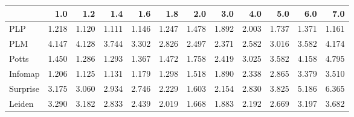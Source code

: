 \begin{tabular}{lrrrrrrrrrrr}
\toprule
{} &   1.0 &   1.2 &   1.4 &   1.6 &   1.8 &   2.0 &   3.0 &   4.0 &   5.0 &   6.0 &   7.0 \\
\midrule
PLP      & 1.218 & 1.120 & 1.111 & 1.146 & 1.247 & 1.478 & 1.892 & 2.003 & 1.737 & 1.371 & 1.161 \\
PLM      & 4.147 & 4.128 & 3.744 & 3.302 & 2.826 & 2.497 & 2.371 & 2.582 & 3.016 & 3.582 & 4.174 \\
Potts    & 1.450 & 1.286 & 1.293 & 1.367 & 1.472 & 1.758 & 2.419 & 3.025 & 3.582 & 4.158 & 4.795 \\
Infomap  & 1.206 & 1.125 & 1.131 & 1.179 & 1.298 & 1.518 & 1.890 & 2.338 & 2.865 & 3.379 & 3.510 \\
Surprise & 3.175 & 3.060 & 2.934 & 2.746 & 2.229 & 1.603 & 2.154 & 2.830 & 3.825 & 5.186 & 6.365 \\
Leiden   & 3.290 & 3.182 & 2.833 & 2.439 & 2.019 & 1.668 & 1.883 & 2.192 & 2.669 & 3.197 & 3.682 \\
\bottomrule
\end{tabular}
